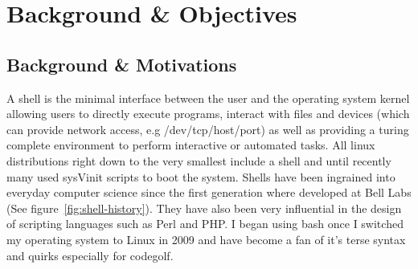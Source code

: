 \chapter{Background \& Objectives}






\section{Background \& Motivations}
A shell is the minimal interface between the user and the operating system kernel allowing users to directly execute programs, interact with files and devices (which can provide network access, e.g /dev/tcp/host/port) as well as providing a turing complete environment to perform interactive or automated tasks.
All linux distributions right down to the very smallest\cite{ALPINE-LINUX} include a shell and until recently many used sysVinit scripts to boot the system.
Shells have been ingrained into everyday computer science since the first generation where developed at Bell Labs (See figure~\ref{fig:shell-history}).
They have also been very influential in the design of scripting languages such as Perl and PHP. 
I began using bash once I switched my operating system to Linux in 2009 and have become a fan of it's terse syntax and quirks especially for codegolf\cite{CODE-GOLF}. %

